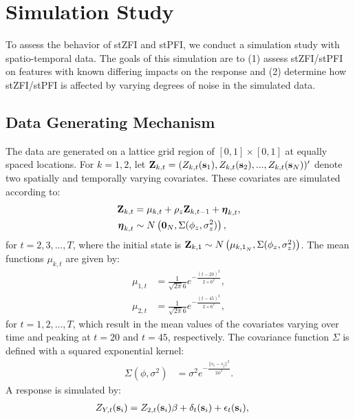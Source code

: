 \documentclass[AMS,STIX2COL]{WileyNJD-v2}
\begin{document}
\section{Simulation Study} \label{sec:sim}

To assess the behavior of stZFI and stPFI, we conduct a simulation study with spatio-temporal data. The goals of this simulation are to (1) assess stZFI/stPFI on features with known differing impacts on the response and (2) determine how stZFI/stPFI is affected by varying degrees of noise in the simulated data.

\subsection{Data Generating Mechanism}

The data are generated on a lattice grid region of $[0,1]\times [0,1]$ at equally spaced locations. For $k=1,2$, let ${\bf Z}_{k,t} = (Z_{k,t}({\bf s}_1),Z_{k,t}({\bf s}_2),...,Z_{k,t}({\bf s}_N))'$ denote two spatially and temporally varying covariates. These covariates are simulated according to:
\begin{align}
    {\bf Z}_{k,t} &= \mu_{k,t} + \rho_{z} {\bf Z}_{k,t-1} + \boldsymbol{\eta}_{k,t},\\
    \boldsymbol{\eta}_{k,t} &\sim N \left({\bf 0}_N, \Sigma(\phi_z,\sigma^2_z)\right),  
\end{align}
for $t=2,3,...,T$, where the initial state is ${\bf Z}_{k,1} \sim N \left(\mu_{{k,1}_{N}},\Sigma(\phi_z,\sigma^2_z)\right)$.  The mean functions $\mu_{k,t}$ are given by:
\begin{align}
    \mu_{1,t} &= \frac{1}{\sqrt{2\pi}6} e^{-\frac{(t-20)^2}{2\times 6^2}}, \label{eq:sim-mean1}\\
    \mu_{2,t} &= \frac{1}{\sqrt{2\pi}6} e^{-\frac{(t-45)^2}{2\times 6^2}}, \label{eq:sim-mean2}
\end{align}
for $t=1,2,...,T$, which result in the mean values of the covariates varying over time and peaking at $t=20$ and $t=45$, respectively. The covariance function $\Sigma$ is defined with a squared exponential kernel:
\begin{align}
    \Sigma \left(\phi,\sigma^2 \right) &= \sigma^2 e^{-\frac{||s_i-s_j||^2}{2\phi^2}}. \label{eq:covariance-kernel}
\end{align}
A response is simulated by:
\begin{align}
    Z_{Y,t}({\bf s}_i) &=  Z_{2,t}({\bf s}_i) \beta + \delta_t({\bf s}_i) + \epsilon_t({\bf s}_i),\ \label{eq:dgm}
\end{align}
\end{document}

